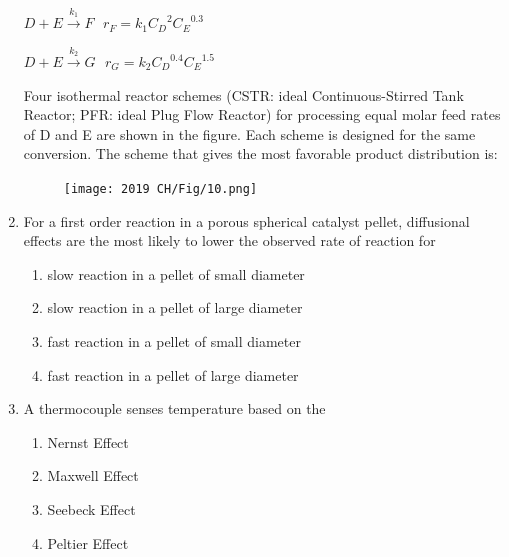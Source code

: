 \documentclass[journal,12pt,onecolumn]{IEEEtran}
\theoremstyle{remark}
\begin{document}
\begin{enumerate}
     $D + E \overset{k_1}{\to} F \hspace{8pt} r_F = k_1 {C_D}^{2} {C_E}^{0.3}$ 

   
        
            $D + E \overset{k_2}{\to} G \hspace{8pt} r_G = k_2 {C_D}^{0.4} {C_E}^{1.5}$
    
        
Four isothermal reactor schemes (CSTR: ideal Continuous-Stirred Tank Reactor; PFR: ideal Plug Flow Reactor) for processing equal molar feed rates of D and E are shown in the figure. Each scheme is designed for the same conversion. The scheme that gives the most favorable product distribution is:

 \hfill{}
\begin{figure}[H]
    \centering
    \texttt{[image: 2019 CH/Fig/10.png]}
    \caption{}
    \label{fig:10}
\end{figure}

    \item For a first order reaction in a porous spherical catalyst pellet, diffusional effects are the most likely to lower the observed rate of reaction for
    
 \hfill{}
\begin{enumerate}
    \item slow reaction in a pellet of small diameter
    \item slow reaction in a pellet of large diameter
    \item fast reaction in a pellet of small diameter
    \item fast reaction in a pellet of large diameter
\end{enumerate}

      \item  A thermocouple senses temperature based on the 
      
 \hfill{}
  

\begin{multicols}{4}
    \begin{enumerate}
        \item Nernst Effect
        \item Maxwell Effect
        \item Seebeck Effect
        \item Peltier Effect
    \end{enumerate}
\end{multicols}


\end{enumerate}
\end{document}

